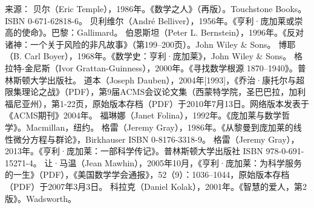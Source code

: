 来源：
贝尔（Eric Temple），1986年。《数学之人》（再版）。Touchstone Books。ISBN 0-671-62818-6。
贝利维尔（André Belliver），1956年。《亨利·庞加莱或崇高的使命》。巴黎：Gallimard。
伯恩斯坦（Peter L. Bernstein），1996年。《反对诸神：一个关于风险的非凡故事》（第199–200页）。John Wiley & Sons。
博耶（B. Carl Boyer），1968年。《数学史：亨利·庞加莱》，John Wiley & Sons。
格拉特-金尼斯（Ivor Grattan-Guinness），2000年。《寻找数学根源 1870–1940》。普林斯顿大学出版社。
道本（Joseph Dauben），2004年[1993]，《乔治·康托尔与超限集理论之战》（PDF），第9届ACMS会议论文集（西蒙特学院，圣巴巴拉，加利福尼亚州），第1-22页，原始版本存档（PDF）于2010年7月13日。网络版本发表于《ACMS期刊》2004年。
福琳娜（Janet Folina），1992年。《庞加莱与数学哲学》。Macmillan，纽约。
格雷（Jeremy Gray），1986年。《从黎曼到庞加莱的线性微分方程与群论》，Birkhauser ISBN 0-8176-3318-9。
格雷（Jeremy Gray），2013年。《亨利·庞加莱：一部科学传记》。普林斯顿大学出版社 ISBN 978-0-691-15271-4。
让·马温（Jean Mawhin），2005年10月，《亨利·庞加莱：为科学服务的一生》（PDF），《美国数学学会通报》，52（9）：1036–1044，原始版本存档（PDF）于2007年3月3日。
科拉克（Daniel Kolak），2001年。《智慧的爱人，第2版》。Wadsworth。